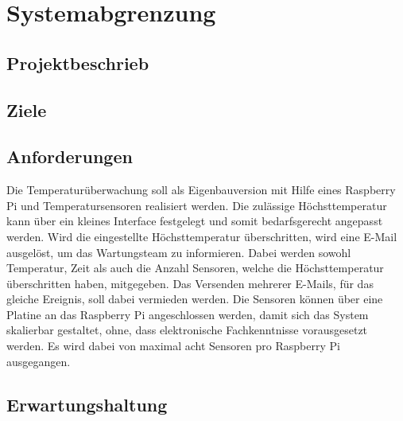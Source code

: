 \section{Systemabgrenzung}
\subsection{Projektbeschrieb}
\subsection{Ziele}
\subsection{Anforderungen}
Die Temperaturüberwachung soll als Eigenbauversion mit Hilfe eines Raspberry Pi und Temperatursensoren realisiert werden. Die zulässige Höchsttemperatur kann über ein kleines Interface festgelegt und somit bedarfsgerecht angepasst werden. Wird die eingestellte Höchsttemperatur überschritten, wird eine E-Mail ausgelöst, um das Wartungsteam zu informieren. Dabei werden sowohl Temperatur, Zeit als auch die Anzahl Sensoren, welche die Höchsttemperatur überschritten haben, mitgegeben. Das Versenden mehrerer E-Mails, für das gleiche Ereignis, soll dabei vermieden werden. Die Sensoren können über eine Platine an das Raspberry Pi angeschlossen werden, damit sich das System skalierbar gestaltet, ohne, dass elektronische Fachkenntnisse vorausgesetzt werden. Es wird dabei von maximal acht Sensoren pro Raspberry Pi ausgegangen.
\subsection{Erwartungshaltung}